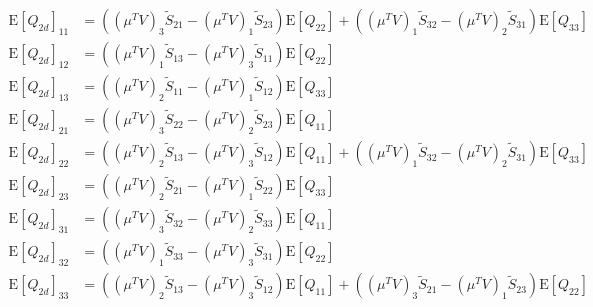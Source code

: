 \documentclass[10pt]{article}
\newcommand{\expect}[1]{\ensuremath{\mathrm{E}\left[ #1 \right]}}
\begin{document}
\begin{align}
	\expect{Q_{2d}}_{11} &= \left( (\mu^TV)_3\tilde{S}_{21} - (\mu^TV)_1\tilde{S}_{23} \right)\expect{Q_{22}} + \left( (\mu^TV)_1\tilde{S}_{32} - (\mu^TV)_2\tilde{S}_{31} \right)\expect{Q_{33}} \nonumber \\
	\expect{Q_{2d}}_{12} &= \left( (\mu^TV)_1\tilde{S}_{13} - (\mu^TV)_3\tilde{S}_{11} \right)\expect{Q_{22}} \nonumber \\
	\expect{Q_{2d}}_{13} &= \left( (\mu^TV)_2\tilde{S}_{11} - (\mu^TV)_1\tilde{S}_{12} \right)\expect{Q_{33}} \nonumber \\
	\expect{Q_{2d}}_{21} &= \left( (\mu^TV)_3\tilde{S}_{22} - (\mu^TV)_2\tilde{S}_{23} \right)\expect{Q_{11}} \nonumber \\
	\expect{Q_{2d}}_{22} &= \left( (\mu^TV)_2\tilde{S}_{13} - (\mu^TV)_3\tilde{S}_{12} \right)\expect{Q_{11}} + \left( (\mu^TV)_1\tilde{S}_{32} - (\mu^TV)_2\tilde{S}_{31} \right)\expect{Q_{33}} \nonumber \\
	\expect{Q_{2d}}_{23} &= \left( (\mu^TV)_2\tilde{S}_{21} - (\mu^TV)_1\tilde{S}_{22} \right)\expect{Q_{33}} \nonumber \\
	\expect{Q_{2d}}_{31} &= \left( (\mu^TV)_3\tilde{S}_{32} - (\mu^TV)_2\tilde{S}_{33} \right)\expect{Q_{11}} \nonumber \\
	\expect{Q_{2d}}_{32} &= \left( (\mu^TV)_1\tilde{S}_{33} - (\mu^TV)_3\tilde{S}_{31} \right)\expect{Q_{22}} \nonumber \\
	\expect{Q_{2d}}_{33} &= \left( (\mu^TV)_2\tilde{S}_{13} - (\mu^TV)_3\tilde{S}_{12} \right)\expect{Q_{11}} + \left( (\mu^TV)_3\tilde{S}_{21} - (\mu^TV)_1\tilde{S}_{23} \right)\expect{Q_{22}}
\end{align}
\end{document}
